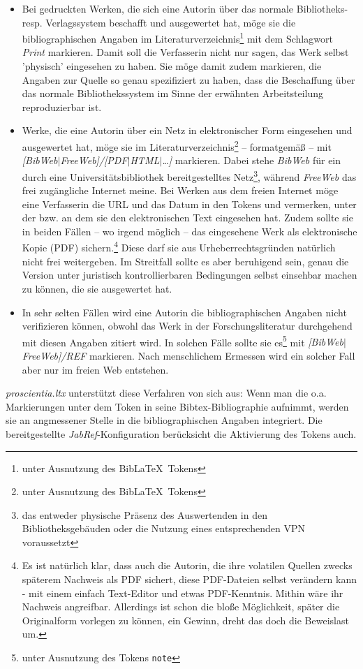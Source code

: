 \begin{itemize}
  \item Bei gedruckten Werken, die sich eine Autorin über das normale Bibliotheks- resp. Verlagssystem beschafft und  ausgewertet hat, möge sie die bibliographischen Angaben im Literaturverzeichnis\footnote{unter Ausnutzung des Bib\LaTeX\ Tokens } mit dem Schlagwort \emph{Print} markieren. Damit soll die Verfasserin nicht nur sagen, das Werk selbst 'physisch' eingesehen zu haben. Sie möge damit zudem markieren, die Angaben zur Quelle so genau spezifiziert zu haben, dass die Beschaffung über das normale Bibliothekssystem im Sinne der erwähnten Arbeitsteilung reproduzierbar ist.
  \item Werke, die eine Autorin über ein Netz in elektronischer Form eingesehen und ausgewertet hat, möge sie im Literaturverzeichnis\footnote{unter Ausnutzung des Bib\LaTeX\ Tokens }  -- formatgemäß -- mit \emph{[BibWeb$|$FreeWeb]/[PDF$|$HTML$|$\ldots]} markieren. Dabei stehe \emph{BibWeb} für ein durch eine Universitätsbibliothek bereitgestelltes Netz\footnote{das entweder physische Präsenz des Auswertenden in den Bibliotheksgebäuden oder die Nutzung eines entsprechenden VPN voraussetzt}, während \emph{FreeWeb} das frei zugängliche Internet meine. Bei Werken aus dem freien Internet möge eine Verfasserin die URL und das Datum in den Tokens  und  vermerken, unter der bzw. an dem sie den elektronischen Text eingesehen hat. Zudem sollte sie in beiden Fällen -- wo irgend möglich -- das eingesehene Werk als elektronische Kopie (PDF) sichern.\footnote{Es ist natürlich klar, dass auch die Autorin, die ihre volatilen Quellen zwecks späterem Nachweis als PDF sichert, diese PDF-Dateien selbst verändern kann - mit einem einfach Text-Editor und etwas PDF-Kenntnis. Mithin wäre ihr Nachweis angreifbar. Allerdings ist schon die bloße Möglichkeit, später die Originalform vorlegen zu können, ein Gewinn, dreht das doch die Beweislast um.} Diese darf sie aus Urheberrechtsgründen natürlich nicht frei weitergeben. Im Streitfall sollte es aber beruhigend sein, genau die Version unter juristisch kontrollierbaren Bedingungen selbst einsehbar machen zu können, die sie ausgewertet hat.
  \item In sehr selten Fällen wird eine Autorin die bibliographischen Angaben nicht verifizieren können, obwohl das Werk in der Forschungsliteratur durchgehend mit diesen Angaben zitiert wird. In solchen Fälle sollte sie es\footnote{unter Ausnutzung des Tokens \texttt{note}} mit \emph{[BibWeb$|$FreeWeb]/REF} markieren. Nach menschlichem Ermessen wird ein solcher Fall aber nur im freien Web entstehen.
\end{itemize}

\emph{proscientia.ltx} unterstützt diese Verfahren von sich aus: Wenn man die o.a. Markierungen unter dem Token  in seine Bibtex-Bibliographie aufnimmt, werden sie an angmessener Stelle in die bibliographischen Angaben integriert. Die bereitgestellte \emph{JabRef}-Konfiguration berücksicht die Aktivierung des Tokens auch.
%
